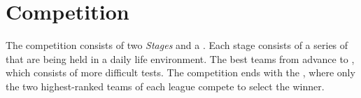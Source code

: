 \section{Competition}
The competition consists of two \emph{Stages} and a \FINAL.
Each stage consists of a series of  that are being held in a daily life environment.
The best teams from \SONE{} advance to \STWO, which consists of more difficult tests.
The competition ends with the \FINAL, where only the two highest-ranked teams of each league compete to select the winner.
